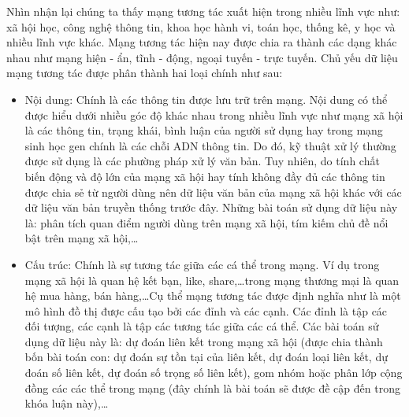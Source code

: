 Nhìn nhận lại chúng ta thấy mạng tương tác xuất hiện trong nhiều lĩnh vực như: xã hội học, công nghệ thông tin, khoa học hành vi, toán học, thống kê, y học và nhiều lĩnh vực khác. Mạng tương tác hiện nay được chia ra thành các dạng khác nhau như mạng hiện - ẩn, tĩnh - động, ngoại tuyến - trực tuyến. Chủ yếu dữ liệu mạng tương tác được phân thành hai loại chính như sau:
\begin{itemize}
	\item Nội dung: Chính là các thông tin được lưu trữ trên mạng. Nội dung có thể được hiểu dưới nhiều góc độ khác nhau trong nhiều lĩnh vực như mạng xã hội là các thông tin, trạng khái, bình luận của người sử dụng hay trong mạng sinh học gen chính là các chỗi ADN thông tin. Do đó, kỹ thuật xử lý thường được sử dụng là các phường pháp xử lý văn bản. Tuy nhiên, do tính chất biến động và độ lớn của mạng xã hội hay tính không đầy đủ các thông tin được chia sẻ từ người dùng nên dữ liệu văn bản của mạng xã hội khác với các dữ liệu văn bản truyền thống trước đây. Những bài toán sử dụng dữ liệu này là: phân tích quan điểm người dùng trên mạng xã hội, tím kiếm chủ đề nổi bật trên mạng xã hội,\dots
	\item Cấu trúc: Chính là sự tương tác giữa các cá thể trong mạng. Ví dụ trong mạng xã hội là quan hệ kết bạn, like, share,\dots trong mạng thương mại là quan hệ mua hàng, bán hàng,\dots Cụ thể mạng tương tác được định nghĩa như là một mô hình đồ thị được cấu tạo bởi các đỉnh và các cạnh. Các đỉnh là tập các đối tượng, các cạnh là tập các tương tác giữa các cá thể. Các bài toán sử dụng dữ liệu này là: dự đoán liên kết trong mạng xã hội (được chia thành bốn bài toán con: dự đoán sự tồn tại của liên kết, dự đoán loại liên kết, dự đoán số liên kết, dự đoán số trọng số liên kết), gom nhóm hoặc phân lớp cộng đồng các các thể trong mạng (đây chính là bài toán sẽ được đề cập đến trong khóa luận này),\dots
\end{itemize}
